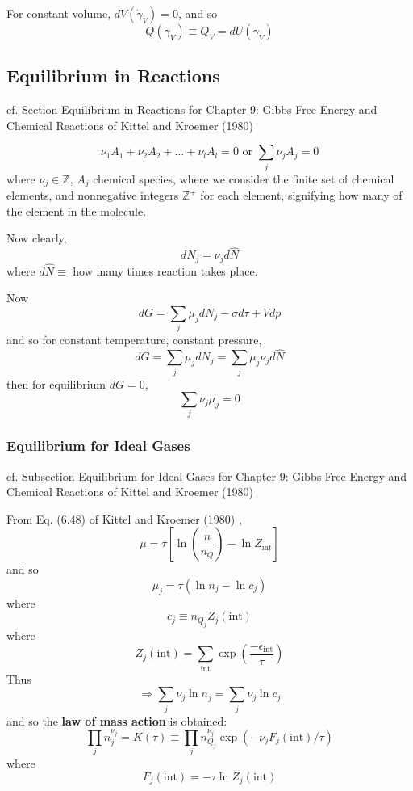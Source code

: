 \documentclass[10pt]{amsart}
\begin{document}
\begin{multicols*}{2}
For constant volume, $dV(\dot{\gamma}_V)=0$, and so 
\[
Q(\dot{\gamma}_V) \equiv Q_V = dU(\dot{\gamma}_V)
\]



\subsection{Equilibrium in Reactions}

cf. Section Equilibrium in Reactions for Chapter 9: Gibbs Free Energy and Chemical Reactions of Kittel and Kroemer (1980) \cite{CKittelHKroemer1980}

\begin{equation}
  \nu_1 A_1 + \nu_2 A_2 + \dots + \nu_l A_l = 0 \text{ or } \sum_j \nu_j A_j = 0
\end{equation}
where $\nu_j \in \mathbb{Z}$, $A_j$ chemical species, where we consider the finite set of chemical elements, and nonnegative integers $\mathbb{Z}^+$ for each element, signifying how many of the element in the molecule.  

Now clearly,
\[
dN_j = \nu_j d\widehat{N}
\]
where $d\widehat{N} \equiv$ how many times reaction takes place.

Now
\[
dG = \sum_j \mu_j dN_j - \sigma d\tau + Vdp
\]
and so for constant temperature, constant pressure, 
\[
dG = \sum_j \mu_j dN_j = \sum_j \mu_j \nu_j d\widehat{N} 
\]
then for equilibrium $dG=0$, 
\begin{equation}
\boxed{ \sum_j \nu_j \mu_j = 0 }
\end{equation}


\subsubsection{Equilibrium for Ideal Gases}

cf. Subsection Equilibrium for Ideal Gases for Chapter 9: Gibbs Free Energy and Chemical Reactions of Kittel and Kroemer (1980) \cite{CKittelHKroemer1980}

From Eq. (6.48) of Kittel and Kroemer (1980) \cite{CKittelHKroemer1980}, 
\[
\mu = \tau [ \ln{ \left( \frac{n}{n_Q} \right)} - \ln{ Z_{\text{int}} } ]
\]
and so
\[
\mu_j = \tau (\ln{ n_j} - \ln{c_j})
\]
where 
\[
c_j \equiv n_{Q_j} Z_j(\text{int})
\]
where
\[
Z_j(\text{int}) = \sum_{\text{int}} \exp{ \left( \frac{-\epsilon_{\text{int}} }{\tau} \right) }
\]
Thus
\[
\Longrightarrow \sum_j \nu_j \ln{n_j} = \sum_j \nu_j \ln{c_j}
\]
and so the \textbf{law of mass action} is obtained:
\begin{equation}
  \boxed{ \prod_j n_j^{\nu_j} = K(\tau) \equiv \prod_j n_{Q_j}^{\nu_j} \exp{ \left( -\nu_j F_j(\text{int})/ \tau \right) }  }
\end{equation}
where
\[
F_j(\text{int}) = -\tau \ln{Z_j(\text{int}) }
\]


\end{multicols*}
\end{document}
